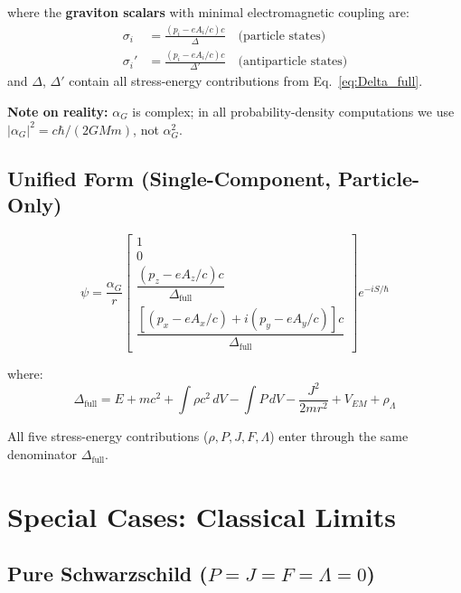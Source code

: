 \documentclass[11pt,a4paper]{article}
\theoremstyle{definition}
\theoremstyle{remark}
\begin{document}
	where the \textbf{graviton scalars} with minimal electromagnetic coupling are:
	\begin{align}
		\sigma_i  &= \frac{(p_i - eA_i/c)c}{\Delta}  \quad\text{(particle states)}    \label{eq:sigma}\\
		\sigma_i' &= \frac{(p_i - eA_i/c)c}{\Delta'} \quad\text{(antiparticle states)} \label{eq:sigma_prime}
	\end{align}
	and $\Delta$, $\Delta'$ contain all stress-energy contributions from Eq.~\eqref{eq:Delta_full}.
	
	\textbf{Note on reality:}  $\alpha_G$ is complex; in all probability-density computations we use $|\alpha_G|^2 = c\hbar/(2GMm)$, not $\alpha_G^2$.
	
	\subsection{Unified Form (Single-Component, Particle-Only)}
	
	\begin{equation}
		\boxed{
			\psi = \frac{\alpha_G}{r}\begin{bmatrix}
				1 \\ 0 \\
				\dfrac{(p_z-eA_z/c)c}{\Delta_{\mathrm{full}}} \\[6pt]
				\dfrac{[(p_x-eA_x/c)+i(p_y-eA_y/c)]c}{\Delta_{\mathrm{full}}}
			\end{bmatrix}e^{-iS/\hbar}
		}
	\end{equation}
	
	where:
	\begin{equation}
		\boxed{
			\Delta_{\mathrm{full}} = E + mc^2 + \int\rho c^2\,dV - \int P\,dV - \frac{J^2}{2mr^2} + V_{EM} + \rho_\Lambda
		}
		\label{eq:Delta_unified}
	\end{equation}
	
	All five stress-energy contributions ($\rho,P,J,F,\Lambda$) enter through the same denominator $\Delta_{\mathrm{full}}$.
	
	\section{Special Cases: Classical Limits}
	
	\subsection{Pure Schwarzschild ($P=J=F=\Lambda=0$)}
	
\end{document}
